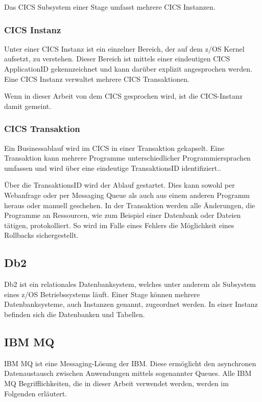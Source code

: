 Das CICS Subsystem einer Stage umfasst mehrere CICS Instanzen.

\subsubsection{CICS Instanz} 
Unter einer CICS Instanz ist ein einzelner Bereich, der auf dem z/OS Kernel aufsetzt, zu verstehen.
Dieser Bereich ist mittels einer eindeutigen CICS ApplicationID gekennzeichnet und kann darüber explizit angesprochen werden.
Eine CICS Instanz verwaltet mehrere CICS Transaktionen.

Wenn in dieser Arbeit von dem CICS gesprochen wird, ist die CICS-Instanz damit gemeint.

\subsubsection{CICS Transaktion}\label{subsec:trans}
Ein Businessablauf wird im CICS in einer Transaktion gekapselt.
Eine Transaktion kann mehrere Programme unterschiedlicher Programmiersprachen umfassen und wird über eine eindeutige \glqq TransaktionsID\grqq{} identifiziert..

Über die TransaktionsID wird der Ablauf gestartet.
Dies kann sowohl per Webanfrage oder per Messaging Queue als auch aus einem anderen Programm heraus oder manuell geschehen.
In der Transaktion werden alle Änderungen, die Programme an Ressourcen, wie zum Beispiel einer Datenbank oder Dateien tätigen, protokolliert.
So wird im Falle eines Fehlers die Möglichkeit eines Rollbacks sichergestellt.
 \cite{Rayns.2011}

\subsection{Db2}\label{sssec:db2}
Db2 ist ein relationales Datenbanksystem, welches unter anderem als Subsystem eines z/OS Betriebssystems läuft.
Einer Stage können mehrere Datenbanksysteme, auch Instanzen genannt, zugeordnet werden.
In einer Instanz befinden sich die Datenbanken und Tabellen.

\subsection{IBM MQ}\label{sec:mq}
IBM MQ ist eine Messaging-Lösung der IBM.
Diese ermöglicht den asynchronen Datenaustausch zwischen Anwendungen mittels sogenannter Queues.
Alle IBM MQ Begrifflichkeiten, die in dieser Arbeit verwendet werden, werden im Folgenden erläutert.
\cite{Aranha.2013}

